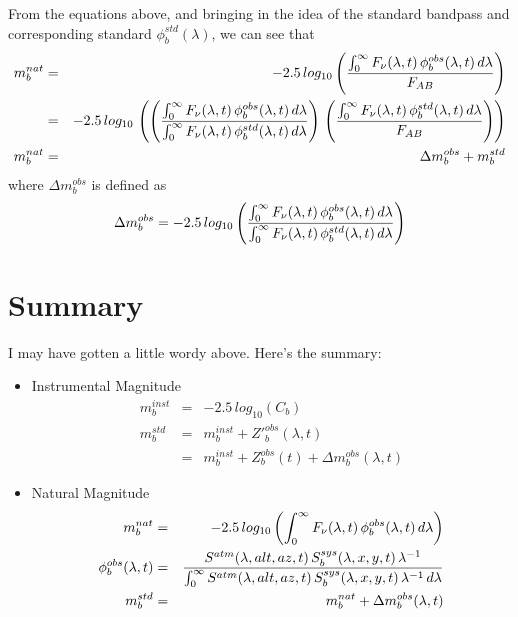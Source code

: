 \documentclass[12pt,preprint]{aastex}
\begin{document}
From the equations above, and bringing in the idea of the standard bandpass and corresponding standard $\phi_b^{std}(\lambda)$, we can see that
\begin{eqnarray}
m_b^{nat} & = & -2.5 \, log_{10} \left( { \int_0^\infty {F_\nu(\lambda,t) \,
    \phi_b^{obs}(\lambda,t) \, d\lambda} \over F_{AB} }  \right) \\
& = & -2.5 \, log_{10} \, \left( \left( { \int_0^\infty {F_\nu(\lambda,t) \,
    \phi_b^{obs}(\lambda,t) \, d\lambda} \over \int_0^\infty {F_\nu(\lambda,t) \,
    \phi_b^{std}(\lambda,t) \, d\lambda}} \right) \, \left( {\int_0^\infty {F_\nu(\lambda,t) \,
    \phi_b^{std}(\lambda,t) \, d\lambda} \over F_{AB}} \right) \right) \\
m_b^{nat} & = & \Delta m_b^{obs} + m_b^{std} 
\end{eqnarray}
where $\Delta m_b^{obs}$ is defined as 
\begin{equation}
\Delta m_b^{obs} = -2.5\, log_{10} \left( { \int_0^\infty {F_\nu(\lambda,t) \,
    \phi_b^{obs}(\lambda,t) \, d\lambda} \over \int_0^\infty {F_\nu(\lambda,t) \,
    \phi_b^{std}(\lambda,t) \, d\lambda}} \right) 
\end{equation}

\clearpage
\section{Summary}

I may have gotten a little wordy above. Here's the summary: 
\begin{itemize}
\item{Instrumental Magnitude}
\begin{eqnarray}
m_b^{inst} & =  & -2.5\,log_{10}(C_b)  \\
m_b^{std} & = & m_b^{inst} + {Z'}_b^{obs}(\lambda, t) \\
                 & = & m_b^{inst} + Z_b^{obs}(t) + \Delta m_b^{obs}(\lambda, t)
\end{eqnarray}
\item{Natural Magnitude}
\begin{eqnarray}
m_b^{nat} & = & -2.5\,log_{10} \left( { \int_0^\infty {F_\nu(\lambda,t) \,\phi_b^{obs}(\lambda,t) \, d\lambda} } \right) \\ 
 \phi_b^{obs}(\lambda,t) & = &  {
     {S^{atm}(\lambda,alt,az,t)\, S_b^{sys}(\lambda,x,y,t) \,
       \lambda^{-1}} \over
     \int_0^\infty { {S^{atm}(\lambda,alt,az,t) \,
         S_b^{sys}(\lambda,x,y,t) \, \lambda^{-1}} \,d\lambda}} \\
m_b^{std} & = & m_b^{nat} + \Delta m_b^{obs}(\lambda, t) 
\end{eqnarray}
\end{itemize}
\end{document}

